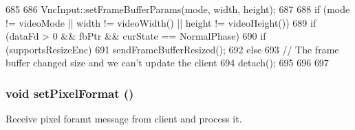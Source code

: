 \begin{DoxyCode}
685 {
686     VncInput::setFrameBufferParams(mode, width, height);
687 
688     if (mode != videoMode || width != videoWidth() || height != videoHeight()) {
689         if (dataFd > 0 && fbPtr && curState == NormalPhase) {
690             if (supportsResizeEnc)
691                 sendFrameBufferResized();
692             else
693                 // The frame buffer changed size and we can't update the client
694                 detach();
695         }
696     }
697 }
\end{DoxyCode}
\hypertarget{classVncServer_ad52ea030be3bb8b536f8a7f87b709319}{
\subsubsection[{setPixelFormat}]{\setlength{\rightskip}{0pt plus 5cm}void setPixelFormat ()}}
\label{classVncServer_ad52ea030be3bb8b536f8a7f87b709319}
Receive pixel foramt message from client and process it. 


